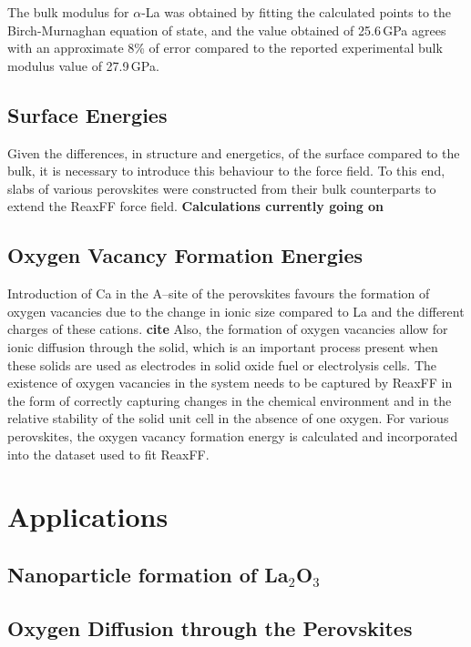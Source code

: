 \documentclass[journal=jpcafh,manuscript=article]{achemso}
\begin{document}
The bulk modulus for $\alpha$-La was obtained by fitting the calculated points to the Birch-Murnaghan equation of state\cite{fu_first-principles_1983}, and the value obtained of 25.6\,GPa agrees with an approximate 8\% of error compared to the reported experimental bulk modulus value of 27.9\,GPa.\cite{lide2003crc}

\subsection{Surface Energies}

Given the differences, in structure and energetics, of the surface compared to the bulk, it is necessary to introduce this behaviour to the force field.
To this end, slabs of various perovskites were constructed from their bulk counterparts to extend the ReaxFF force field.
\textbf{Calculations currently going on}

\subsection{Oxygen Vacancy Formation Energies}

Introduction of Ca in the A--site of the perovskites favours the formation of oxygen vacancies due to the change in ionic size compared to La and the different charges of these cations. \textbf{cite}
Also, the formation of oxygen vacancies allow for ionic diffusion through the solid, which is an important process present when these solids are used as electrodes in solid oxide fuel or electrolysis cells.
The existence of oxygen vacancies in the system needs to be captured by ReaxFF in the form of correctly capturing changes in the chemical environment and in the relative stability of the solid unit cell in the absence of one oxygen.
For various perovskites, the oxygen vacancy formation energy is calculated and incorporated into the dataset used to fit ReaxFF.

\section{Applications}
\label{sec:applications}

\subsection{Nanoparticle formation of La$_2$O$_3$}



\subsection{Oxygen Diffusion through the Perovskites}
\end{document}
